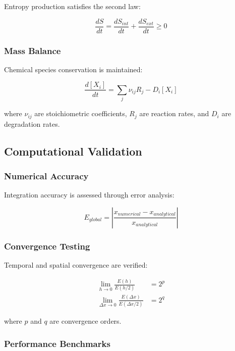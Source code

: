 \documentclass[12pt,a4paper]{article}
\begin{document}
Entropy production satisfies the second law:

\begin{equation}
\frac{dS}{dt} = \frac{dS_{int}}{dt} + \frac{dS_{ext}}{dt} \geq 0
\end{equation}

\subsubsection{Mass Balance}

Chemical species conservation is maintained:

\begin{equation}
\frac{d[X_i]}{dt} = \sum_j \nu_{ij} R_j - D_i[X_i]
\end{equation}

where $\nu_{ij}$ are stoichiometric coefficients, $R_j$ are reaction rates, and $D_i$ are degradation rates.

\subsection{Computational Validation}

\subsubsection{Numerical Accuracy}

Integration accuracy is assessed through error analysis:

\begin{equation}
E_{global} = \left|\frac{x_{numerical} - x_{analytical}}{x_{analytical}}\right|
\end{equation}

\subsubsection{Convergence Testing}

Temporal and spatial convergence are verified:

\begin{align}
\lim_{h \rightarrow 0} \frac{E(h)}{E(h/2)} &= 2^p \\
\lim_{\Delta x \rightarrow 0} \frac{E(\Delta x)}{E(\Delta x/2)} &= 2^q
\end{align}

where $p$ and $q$ are convergence orders.

\subsubsection{Performance Benchmarks}
\end{document}
